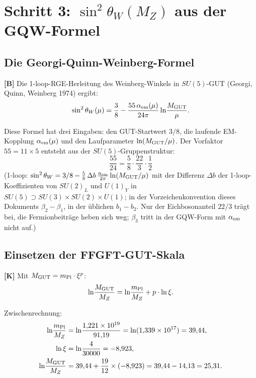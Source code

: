 \section{Schritt 3: $\sin^2\theta_W(M_Z)$ aus der GQW-Formel}

\subsection{Die Georgi-Quinn-Weinberg-Formel}

\textbf{[B]} Die 1-loop-RGE-Herleitung des Weinberg-Winkels in
$SU(5)$-GUT (Georgi, Quinn, Weinberg 1974) ergibt:
\begin{equation}
  \sin^2\theta_W(\mu)
  = \frac{3}{8}
  - \frac{55\,\alpha_{\rm em}(\mu)}{24\pi}
    \ln\!\frac{M_{\rm GUT}}{\mu}.
  \label{eq:GQW}
\end{equation}

Diese Formel hat drei Eingaben: den GUT-Startwert $3/8$, die laufende
EM-Kopplung $\alpha_{\rm em}(\mu)$ und den Laufparameter
$\ln(M_{\rm GUT}/\mu)$. Der Vorfaktor $55 = 11 \times 5$ entsteht
aus der $SU(5)$-Gruppenstruktur:
\begin{equation}
  \frac{55}{24}
  = \frac{5}{8}\cdot\frac{22}{3}\cdot\frac{1}{2}
  \label{eq:55erklaer}
\end{equation}
(1-loop: $\sin^2\theta_W = 3/8 - \tfrac58\,\Delta b\,\tfrac{\alpha_{\rm em}}{2\pi}\ln(M_{\rm GUT}/\mu)$ mit der Differenz $\Delta b$ der 1-loop-Koeffizienten von $SU(2)_L$ und $U(1)_Y$ in $SU(5) \supset SU(3)\times SU(2)\times U(1)$; in der Vorzeichenkonvention dieses Dokuments $\beta_2 - \beta_1$, in der üblichen $b_1 - b_2$. Nur der Eichbosonanteil $22/3$ trägt bei, die Fermionbeiträge heben sich weg; $\beta_3$ tritt in der GQW-Form mit $\alpha_{\rm em}$ nicht auf.)

\subsection{Einsetzen der FFGFT-GUT-Skala}

\textbf{[K]} Mit $M_{\rm GUT} = m_{\rm Pl}\cdot\xi^{p}$:
\begin{equation}
  \ln\!\frac{M_{\rm GUT}}{M_Z}
  = \ln\!\frac{m_{\rm Pl}}{M_Z} + p\cdot\ln\xi.
  \label{eq:Laufparam}
\end{equation}

Zwischenrechnung:
\begin{align}
  \ln\!\frac{m_{\rm Pl}}{M_Z}
  &= \ln\!\frac{1{,}221\times10^{19}}{91{,}19}
   = \ln(1{,}339\times10^{17}) = 39{,}44,
  \label{eq:lnmPl}\\
  \ln\xi
  &= \ln\!\frac{4}{30000} = -8{,}923,
  \label{eq:lnxi}\\
  \ln\!\frac{M_{\rm GUT}}{M_Z}
  &= 39{,}44 + \frac{19}{12}\times(-8{,}923)
   = 39{,}44 - 14{,}13 = 25{,}31.
  \label{eq:Lnum}
\end{align}

